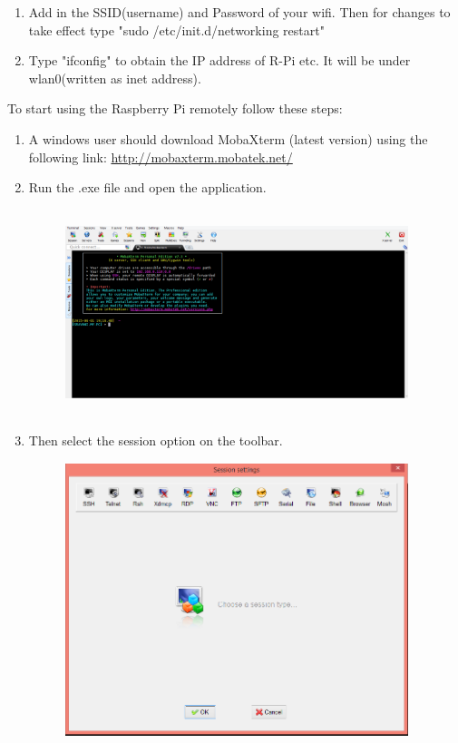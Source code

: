\documentclass[11pt,a4paper]{article}
\begin{document}
\begin{enumerate}
\begin{figure}[h!]
			\centering
		\end{figure}
		\item Add in the SSID(username) and Password of your wifi. Then for changes to take effect type "sudo /etc/init.d/networking restart" 
		\item Type "ifconfig" to obtain the IP address of R-Pi etc. It will be under wlan0(written as inet address).
	\end{enumerate}
	
		
	To start using the Raspberry Pi remotely follow these steps:
	\begin{enumerate}
		\item A windows user should download MobaXterm (latest version) using the following link: \url{http://mobaxterm.mobatek.net/}
		\item Run the .exe file and open the application.
		\begin{figure}[h!]
			\includegraphics[width=10cm,height=6cm]{M1.PNG}
			\centering
		\end{figure}
		\item Then select the session option on the toolbar.
		\begin{figure}[h!]
			\includegraphics[width=10cm,height=8cm]{M2.PNG}

\end{figure}
\end{enumerate}
\end{document}
